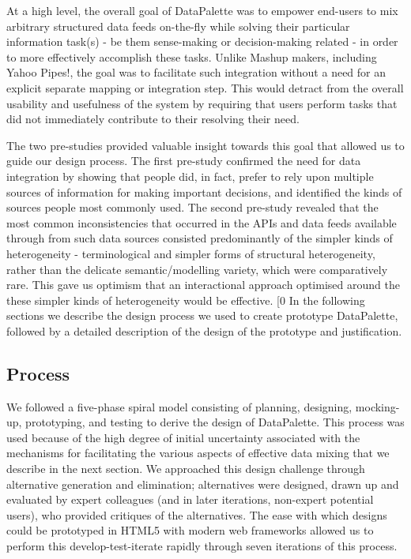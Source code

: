 \documentclass{sigchi}
\begin{document}
At a high level, the overall goal of DataPalette was to empower end-users to mix arbitrary structured data feeds on-the-fly while solving their particular information task(s) - be them sense-making or decision-making related - in order to more effectively accomplish these tasks.  Unlike Mashup makers, including Yahoo Pipes!, the goal was to facilitate such integration without a need for an explicit separate mapping or integration step.  This would detract from the overall usability and usefulness of the system by requiring that users perform tasks that did not immediately contribute to their resolving their need.

The two pre-studies provided valuable insight towards this goal that allowed us to guide our design process. The first pre-study confirmed the need for data integration by showing that people did, in fact, prefer to rely upon multiple sources of information for making important decisions, and identified the kinds of sources people most commonly used.  The second pre-study revealed that the most common inconsistencies that occurred in the APIs and data feeds available through from such data sources consisted predominantly of the simpler kinds of heterogeneity - terminological and simpler forms of structural heterogeneity, rather than the delicate semantic/modelling variety, which were comparatively rare. This gave us optimism that an interactional approach optimised around the these simpler kinds of heterogeneity would be effective.
[0
In the following sections we describe the design process we used to create prototype DataPalette, followed by a detailed description of the design of the prototype and justification.

\subsection{Process}
We followed a five-phase spiral model consisting of planning, designing, mocking-up, prototyping, and testing to derive the design of DataPalette.  This process was used because of the high degree of initial uncertainty associated with the mechanisms for facilitating the various aspects of effective data mixing that we describe in the next section. We approached this design challenge through alternative generation and elimination; alternatives were designed, drawn up and evaluated by expert colleagues (and in later iterations, non-expert potential users), who provided critiques of the alternatives. The ease with which designs could be prototyped in HTML5 with modern web frameworks allowed us to perform this develop-test-iterate rapidly through seven iterations of this process.
\end{document}
